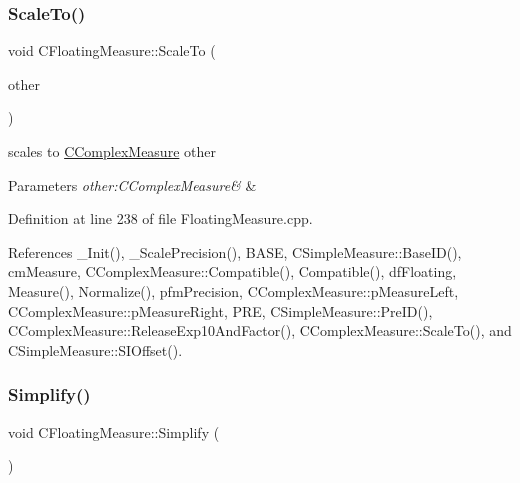 \mbox{\label{classCFloatingMeasure_a841b94d2883274e67999688fad40d538}} 
\subsubsection{\texorpdfstring{Scale\+To()}{ScaleTo()}\hspace{0.1cm}{\footnotesize\ttfamily [2/2]}}
{\footnotesize\ttfamily void C\+Floating\+Measure\+::\+Scale\+To (\begin{DoxyParamCaption}\item[{const \hyperlink{classCComplexMeasure}{C\+Complex\+Measure} \&}]{other }\end{DoxyParamCaption})}



scales to \hyperlink{classCComplexMeasure}{C\+Complex\+Measure} other 


\begin{DoxyParams}{Parameters}
{\em other\+:\+C\+Complex\+Measure\&} & \\
\hline
\end{DoxyParams}


Definition at line 238 of file Floating\+Measure.\+cpp.



References \+\_\+\+Init(), \+\_\+\+Scale\+Precision(), B\+A\+SE, C\+Simple\+Measure\+::\+Base\+I\+D(), cm\+Measure, C\+Complex\+Measure\+::\+Compatible(), Compatible(), df\+Floating, Measure(), Normalize(), pfm\+Precision, C\+Complex\+Measure\+::p\+Measure\+Left, C\+Complex\+Measure\+::p\+Measure\+Right, P\+RE, C\+Simple\+Measure\+::\+Pre\+I\+D(), C\+Complex\+Measure\+::\+Release\+Exp10\+And\+Factor(), C\+Complex\+Measure\+::\+Scale\+To(), and C\+Simple\+Measure\+::\+S\+I\+Offset().

\mbox{\label{classCFloatingMeasure_a47731afb871889ee7da5f84b40e3a27f}} 
\subsubsection{\texorpdfstring{Simplify()}{Simplify()}}
{\footnotesize\ttfamily void C\+Floating\+Measure\+::\+Simplify (\begin{DoxyParamCaption}{ }\end{DoxyParamCaption})}



